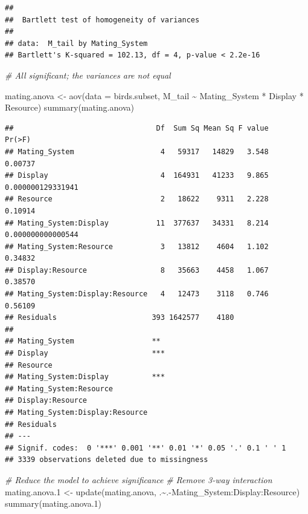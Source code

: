 \documentclass[
  12pt,
]{article}
\newenvironment{Shaded}{\begin{snugshade}}{\end{snugshade}}
\newcommand{\AttributeTok}[1]{\textcolor[rgb]{0.77,0.63,0.00}{#1}}
\newcommand{\CommentTok}[1]{\textcolor[rgb]{0.56,0.35,0.01}{\textit{#1}}}
\newcommand{\FloatTok}[1]{\textcolor[rgb]{0.00,0.00,0.81}{#1}}
\newcommand{\FunctionTok}[1]{\textcolor[rgb]{0.00,0.00,0.00}{#1}}
\newcommand{\NormalTok}[1]{#1}
\newcommand{\OtherTok}[1]{\textcolor[rgb]{0.56,0.35,0.01}{#1}}
\newcommand{\SpecialCharTok}[1]{\textcolor[rgb]{0.00,0.00,0.00}{#1}}
\begin{document}
\begin{verbatim}
## 
##  Bartlett test of homogeneity of variances
## 
## data:  M_tail by Mating_System
## Bartlett's K-squared = 102.13, df = 4, p-value < 2.2e-16
\end{verbatim}

\begin{Shaded}
\begin{Highlighting}[]
\CommentTok{\# All significant; the variances are not equal}

\NormalTok{mating.anova }\OtherTok{\textless{}{-}} \FunctionTok{aov}\NormalTok{(}\AttributeTok{data =}\NormalTok{ birds.subset, M\_tail }\SpecialCharTok{\textasciitilde{}}\NormalTok{ Mating\_System }\SpecialCharTok{*}\NormalTok{ Display }\SpecialCharTok{*}\NormalTok{ Resource)}
\FunctionTok{summary}\NormalTok{(mating.anova)}
\end{Highlighting}
\end{Shaded}

\begin{verbatim}
##                                 Df  Sum Sq Mean Sq F value            Pr(>F)
## Mating_System                    4   59317   14829   3.548           0.00737
## Display                          4  164931   41233   9.865 0.000000129331941
## Resource                         2   18622    9311   2.228           0.10914
## Mating_System:Display           11  377637   34331   8.214 0.000000000000544
## Mating_System:Resource           3   13812    4604   1.102           0.34832
## Display:Resource                 8   35663    4458   1.067           0.38570
## Mating_System:Display:Resource   4   12473    3118   0.746           0.56109
## Residuals                      393 1642577    4180                          
##                                   
## Mating_System                  ** 
## Display                        ***
## Resource                          
## Mating_System:Display          ***
## Mating_System:Resource            
## Display:Resource                  
## Mating_System:Display:Resource    
## Residuals                         
## ---
## Signif. codes:  0 '***' 0.001 '**' 0.01 '*' 0.05 '.' 0.1 ' ' 1
## 3339 observations deleted due to missingness
\end{verbatim}

\begin{Shaded}
\begin{Highlighting}[]
\CommentTok{\# Reduce the model to achieve significance}
\CommentTok{\# Remove 3{-}way interaction}
\NormalTok{mating.anova}\FloatTok{.1} \OtherTok{\textless{}{-}} \FunctionTok{update}\NormalTok{(mating.anova, .}\SpecialCharTok{\textasciitilde{}}\NormalTok{.}\SpecialCharTok{{-}}\NormalTok{Mating\_System}\SpecialCharTok{:}\NormalTok{Display}\SpecialCharTok{:}\NormalTok{Resource) }
\FunctionTok{summary}\NormalTok{(mating.anova}\FloatTok{.1}\NormalTok{)}
\end{Highlighting}
\end{Shaded}
\end{document}

